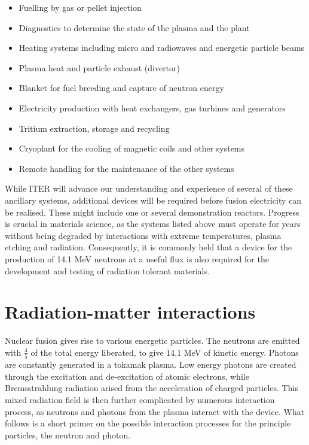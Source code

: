 \begin{itemize}
  \item Fuelling by gas or pellet injection
  \item Diagnostics to determine the state of the plasma and the plant
  \item Heating systems including micro and radiowaves and energetic particle beams
  \item Plasma heat and particle exhaust (divertor)
  \item Blanket for fuel breeding and capture of neutron energy
  \item Electricity production with heat exchangers, gas turbines and generators
  \item Tritium extraction, storage and recycling
  \item Cryoplant for the cooling of magnetic coils and other systems
  \item Remote handling for the maintenance of the other systems
\end{itemize}

While ITER will advance our understanding and experience of several of these ancillary systems, additional devices will be required before fusion electricity can be realised. These might include one or several demonstration reactors. Progress is crucial in materials science, as the systems listed above must operate for years without being degraded by interactions with extreme temperatures, plasma etching and radiation. Consequently, it is commonly held that a device for the production of 14.1 MeV  neutrons at a useful flux is also required for the development and testing of radiation tolerant materials.

\section{Radiation-matter interactions}
Nuclear fusion gives rise to various energetic particles. The neutrons are emitted with $\frac{4}{5}$ of the total energy liberated, to give 14.1 MeV of kinetic energy. Photons are constantly generated in a tokamak plasma. Low energy photons are created through the excitation and de-excitation of atomic electrons, while Bremsstrahlung radiation arised from the acceleration of charged particles. This mixed radiation field is then further complicated by numerous interaction process, as neutrons and photons from the plasma interact with the device. What follows is a short primer on the possible interaction processes for the principle particles, the neutron and photon.

